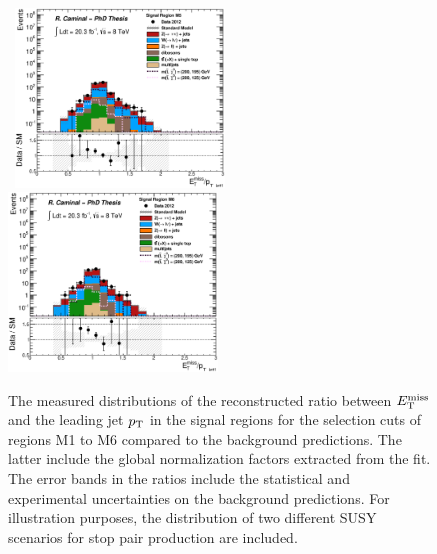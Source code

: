 \begin{figure}[!ht]
\begin{center}
{    }
    \mbox{
      \includegraphics[width=0.495\textwidth]{MonojetAnalysis/Figures/plot_Stop_A9_SR_metpt1_fitted.eps}
      \includegraphics[width=0.495\textwidth]{MonojetAnalysis/Figures/plot_Stop_A10_SR_metpt1_fitted.eps}
    }
  \end{center}
  \caption[Distributions of the ratio between the reconstructed $\met$ and the leading jet $\pt$ in the signal regions for the selection cuts of regions M1 to M6, after the normalization factors extracted from the fit have been applied.]{The measured distributions of the reconstructed ratio between $\met$ and the leading jet $\pt$ in the signal regions for the selection cuts of regions M1 to M6 compared to the background predictions. The latter include the global normalization factors extracted from the fit. The error bands in the ratios include the statistical and experimental uncertainties on the background predictions. For illustration purposes, the distribution of two different SUSY scenarios for stop pair production are included.}
  \label{fig:Plot_M1_SR_metpt1}
\end{figure}
